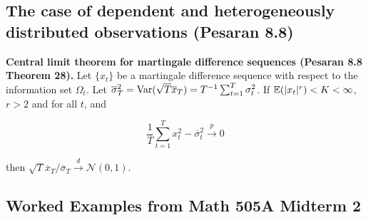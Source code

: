 \subsection{The case of dependent and heterogeneously distributed observations (Pesaran 8.8)}


\begin{theorem}\label{sec:tsch8.8} \textbf{Central limit theorem for martingale difference sequences (Pesaran 8.8 Theorem 28).} Let \(\{x_t\}\) be a martingale difference sequence with respect to the information set \(\Omega_t\). Let \(\overline{\sigma}_T^2 = \mathrm{Var}( \sqrt{T} \overline{x}_T) = T^{-1} \sum_{t=1}^T \sigma_t^2\). If \(\mathbb{E}(|x_t|^r) < K < \infty\), \(r > 2\) and for all \(t\), and

\[
\frac{1}{T} \sum_{t=1}^T x_t^2 - \overline{\sigma}_t^2 \xrightarrow{p} 0
\]

then \(\sqrt{T} \overline{x}_T / \overline{\sigma}_T \xrightarrow{d} \mathcal{N}(0, 1)\).
\end{theorem}

\subsection{Worked Examples from Math 505A Midterm 2}

